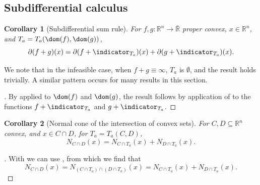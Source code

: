 \documentclass{article}
\theoremstyle{plain}
\newtheorem{corollary}{Corollary}[section]
\theoremstyle{definition}
\theoremstyle{remark}
\begin{document}
\subsection{Subdifferential calculus}
\label{loc:body.main_results.subdifferential_calculus}
\begin{corollary}[Subdifferential sum rule]
\label{loc:qualification:free_subdifferential_additivity.statement}
For $f,g:\mathbb{R}^n\to\bar{\mathbb{R}}$ proper convex, $x  \in \mathbb{R}^n$,
and $T_a = T_a(\dom(f), \dom(g))$,
\begin{equation*}
\partial(f+g)(x) = \partial (f + \indicator_{T_a}) (x) + \partial (g + \indicator_{T_a}) (x).
\end{equation*}
\end{corollary}
We note that in the infeasible case, when $f + g \equiv \infty$, $T_a$ is $\emptyset$, and the result holds trivially. A similar pattern occurs for many results in this section. 
\begin{proof}[\hypertarget{loc:qualification:free_subdifferential_additivity.proof}Proof of \Cref{loc:qualification:free_subdifferential_additivity.statement}]

By
applied to $\dom(f)$ and $\dom(g)$,
the result follows by application of
\cite[Theorem 23.8]{rockafellarConvexAnalysis1970} to the functions $f + \indicator_{T_a}$ and $g + \indicator_{T_a}$.
\end{proof}
\begin{corollary}[Normal cone of the intersection of convex sets]
\label{loc:normal_cone_of_the_intersection_of_convex_sets.statement}
For $C, D \subseteq \mathbb{R}^n$ convex, and $x \in C \cap D$, for $T_a=T_a(C,D)$,
\begin{equation*}
N_{C \cap D}(x) = N_{C \cap T_a}(x) + N_{D \cap T_a}(x).
\end{equation*}
\end{corollary}
\begin{proof}[\hypertarget{loc:normal_cone_of_the_intersection_of_convex_sets.proof}Proof of \Cref{loc:normal_cone_of_the_intersection_of_convex_sets.statement}]

With  we can use
\cite[Corollary 23.8.1]{rockafellarConvexAnalysis1970},
from which we find that
\begin{equation*}
N_{C \cap D}(x) = N_{(C \cap T_a) \cap (D \cap T_a)}(x)= N_{C \cap T_a}(x) + N_{D \cap T_a}(x).
\end{equation*}
\end{proof}
\end{document}
